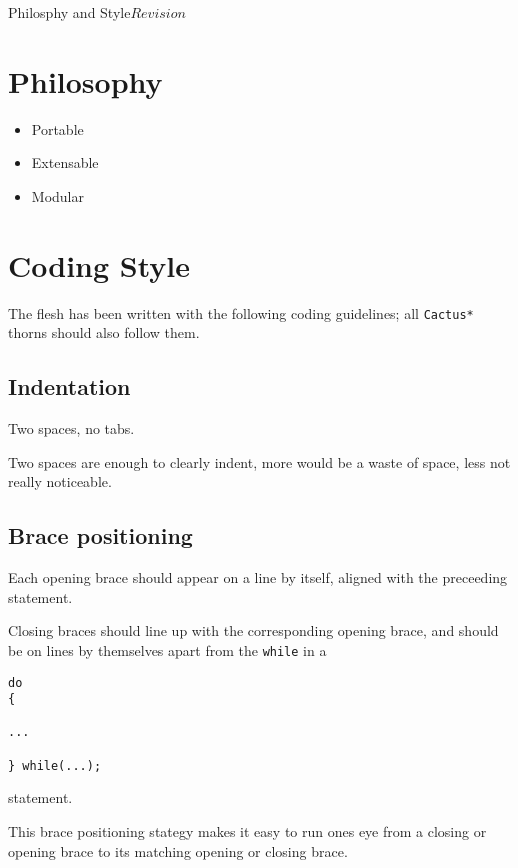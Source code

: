 %   
\begin{cactuspart}{1}{Philosphy and Style}{}{$Revision$}
\renewcommand{\thepage}{\Alph{part}\arabic{page}}

\chapter{Philosophy} 

\begin{itemize}
\item
Portable
\item
Extensable
\item
Modular
\end{itemize}

\chapter{Coding Style}

The flesh has been written with the following coding guidelines;
all {\tt Cactus*} thorns should also follow them.


\section{Indentation}

Two spaces, no tabs.

Two spaces are enough to clearly indent, more would be a waste of
space, less not really noticeable.

\section{Brace positioning}

Each opening brace should appear on a line by itself,
aligned with the preceeding statement.

Closing braces should line up with the corresponding
opening brace, and should be on lines by themselves
apart from the {\tt while} in a 
%
\begin{verbatim}
do
{

...

} while(...);

\end{verbatim}
%
statement.

This brace positioning stategy makes it easy to run ones eye from a closing
or opening brace to its matching opening or closing brace.


\end{cactuspart}

